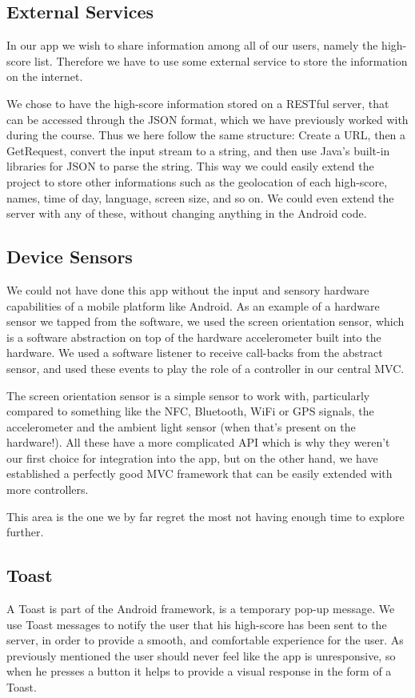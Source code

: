 \documentclass[a4paper, 12pt]{article}
\begin{document}
\subsection{External Services}
In our app we wish to share information among all of our users, namely
the high-score list. Therefore we have to use some external service to
store the information on the internet.

We chose to have the high-score information stored on a RESTful server,
that can be accessed through the JSON format, which we have previously
worked with during the course. Thus we here follow the same structure:
Create a URL, then a GetRequest, convert the input stream to a string,
and then use Java's built-in libraries for JSON to parse the
string. This way we could easily extend the project to store other
informations such as the geolocation of each high-score, names, time of
day, language, screen size, and so on. We could even extend the server
with any of these, without changing anything in the Android code.

\subsection{Device Sensors}
We could not have done this app without the input and sensory hardware
capabilities of a mobile platform like Android. As an example of a
hardware sensor we tapped from the software, we used the screen
orientation sensor, which is a software abstraction on top of the
hardware accelerometer built into the hardware. We used a software
listener to receive call-backs from the abstract sensor, and used these
events to play the role of a controller in our central MVC.

The screen orientation sensor is a simple sensor to work with,
particularly compared to something like the NFC, Bluetooth, WiFi or
GPS signals, the accelerometer and the ambient light sensor (when
that's present on the hardware!). All these have a more complicated
API which is why they weren't our first choice for integration into
the app, but on the other hand, we have established a perfectly good
MVC framework that can be easily extended with more controllers.

This area is the one we by far regret the most not having enough time
to explore further.

\subsection{Toast}
A Toast is part of the Android framework, is a temporary pop-up
message. We use Toast messages to notify the user that his high-score
has been sent to the server, in order to provide a smooth, and
comfortable experience for the user. As previously mentioned the user
should never feel like the app is unresponsive, so when he presses a
button it helps to provide a visual response in the form of a Toast.
\end{document}
